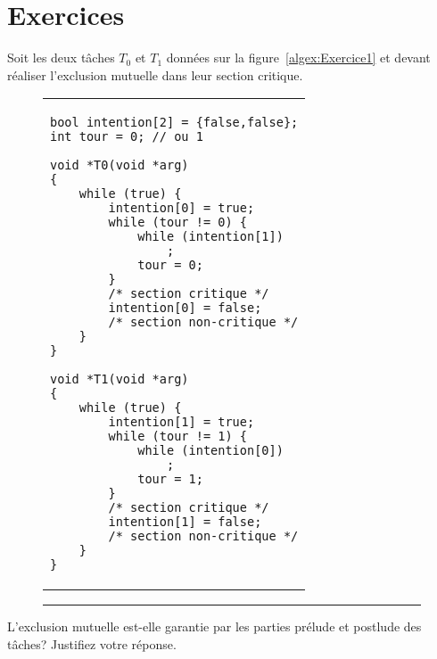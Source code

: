 \section{Exercices}

\startexercice

Soit les deux tâches $T_0$ et $T_1$ données sur la figure~\ref{algex:Exercice1} et devant réaliser l'exclusion mutuelle dans leur section critique.
\begin{figure}[!ht]
\begin{center}
\begin{tabular}{l}
\lstset{language=C++}
\begin{lstlisting}
bool intention[2] = {false,false};
int tour = 0; // ou 1

void *T0(void *arg)
{
	while (true) {
		intention[0] = true;
		while (tour != 0) {
			while (intention[1])
				;
			tour = 0;
		}
		/* section critique */
		intention[0] = false;
		/* section non-critique */
	}
}

void *T1(void *arg)
{
	while (true) {
		intention[1] = true;
		while (tour != 1) {
			while (intention[0])
				;
			tour = 1;
		}
		/* section critique */
		intention[1] = false;
		/* section non-critique */
	}
}
\end{lstlisting}
\end{tabular}
\end{center}
\vspace{-.2cm}
\rule{\textwidth}{0.01in}
\end{figure}
L'exclusion mutuelle est-elle garantie par les parties prélude et postlude des tâches? Justifiez votre réponse.

